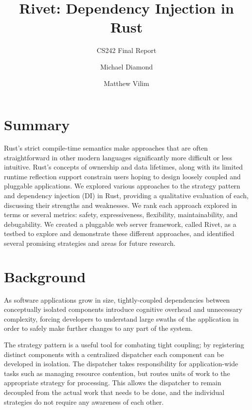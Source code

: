 \documentclass[sigconf]{acmart}
\begin{document}
\title{Rivet: Dependency Injection in Rust}
\subtitle{CS242 Final Report}

\author{Michael Diamond}
\affiliation{}

\author{Matthew Vilim}
\affiliation{}

\maketitle

\section{Summary}

Rust's strict compile-time semantics make approaches that are often straightforward in other modern languages significantly more difficult or less intuitive. Rust's concepts of ownership and data lifetimes, along with its limited runtime reflection support constrain users hoping to design loosely coupled and pluggable applications. We explored various approaches to the strategy pattern\cite{wiki:strategy-pattern} and dependency injection\cite{wiki:di} (DI) in Rust, providing a qualitative evaluation of each, discussing their strengths and weaknesses. We rank each approach explored in terms or several metrics: safety, expressiveness, flexibility, maintainability, and debugability. We created a pluggable web server framework, called Rivet\cite{bitbucket:rivet}, as a testbed to explore and demonstrate these different approaches, and identified several promising strategies and areas for future research.

\section{Background}

As software applications grow in size, tightly-coupled dependencies between conceptually isolated components introduce cognitive overhead and unnecessary complexity, forcing developers to understand large swaths of the application in order to safely make further changes to any part of the system.

The strategy pattern is a useful tool for combating tight coupling; by registering distinct components with a centralized dispatcher each component can be developed in isolation. The dispatcher takes responsibility for application-wide tasks such as managing resource contention, but routes units of work to the appropriate strategy for processing. This allows the dispatcher to remain decoupled from the actual work that needs to be done, and the individual strategies do not require any awareness of each other.
\end{document}
